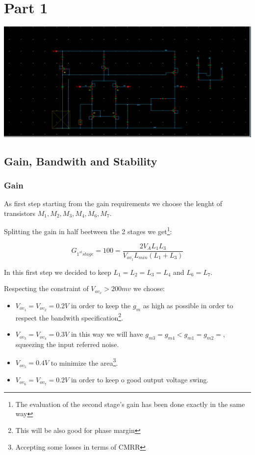 \chapter{Part 1} %
\label{cha:part_1}

\centering
\includegraphics[width=1\textwidth]{Capitoli/whole.png}
\raggedright


\section{Gain, Bandwith and Stability} %
\label{sec:gain_and_bandwith}

\subsection{Gain} %
\label{subsec:gain}



As first step starting from the gain requirements we choose the lenght of transistors $M_1,M_2,M_3,M_4,M_6,M_7.$

Splitting the gain in half beetween the 2 stages we get\footnote{The evaluation of the second stage's gain has been done exactly in the same way}:

\begin{equation}
	G_{1^{st} stage} = 100 = \frac{2V_AL_1L_3}{V_{ov_1}L_{min}(L_1+L_3)}
\end{equation}


In this first step we decided to keep $L_1=L_2=L_3=L_4$ and $L_6=L_7$.

Respecting the constraint of $V_{ov_x} > 200mv$ we choose:

\begin{itemize}
	\item $V_{ov_1}=V_{ov_2}= 0.2V$ in order to keep the $g_m$ as high as possible in order to respect the bandwith specification\footnote{This will be also good for phase margin}.
	\item $V_{ov_3}=V_{ov_4}= 0.3V$ in this way we will have $g_{m3}=g_{m4}<g_{m1}=g_{m2}=$, squeezing the input referred noise.
	\item $V_{ov_5}= 0.4V$ to minimize the area\footnote{Accepting some losses in terms of CMRR}.
	\item $V_{ov_6}=V_{ov_7}= 0.2V$ in order to keep o good output voltage swing. 
\end{itemize}

